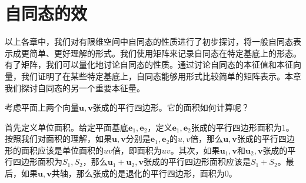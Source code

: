 \documentclass[12pt,UTF8,fontset=none]{ctexbook}
\begin{document}
\chapter{自同态的效}
以上各章中，我们对有限维空间中自同态的性质进行了初步探讨，将一般自同态表示成更简单、更好理解的形式。我们使用矩阵来记录自同态在特定基底上的形态。有了矩阵，我们可以量化地讨论自同态的性质。通过讨论自同态的本征值和本征向量，我们证明了在某些特定基底上，自同态能够用形式比较简单的矩阵表示。本章我们探讨自同态的另一个重要本征量。

考虑平面上两个向量$\mathbf{u}, \mathbf{v}$张成的平行四边形。它的面积如何计算呢？

首先定义单位面积。给定平面基底$\mathbf{e}_1, \mathbf{e}_2$，定义$\mathbf{e}_1, \mathbf{e}_2$张成的平行四边形面积为$1$。按照我们对面积的理解，如果$\mathbf{u}, \mathbf{v}$分别是$\mathbf{e}_1, \mathbf{e}_2$的$u,v$倍，那么$\mathbf{u}, \mathbf{v}$张成的平行四边形的面积应该是单位面积的$uv$倍，即面积为$uv$。其次，如果$\mathbf{u}_1, \mathbf{v}$和$\mathbf{u}_2, \mathbf{v}$张成的平行四边形面积为$S_1, S_2$，那么$\mathbf{u}_1+\mathbf{u}_2, \mathbf{v}$张成的平行四边形面积应该是$S_1+S_2$。最后，如果$\mathbf{u}, \mathbf{v}$共轴，那么张成的是退化的平行四边形，面积为$0$。
\end{document}
